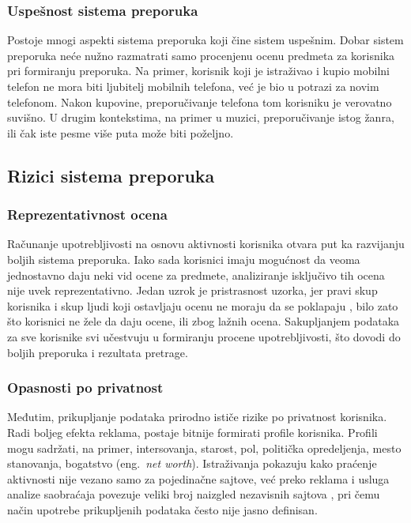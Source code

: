 \documentclass[a4paper]{article}
\begin{document}
\subsubsection{Uspešnost sistema preporuka}
\label{subsubsec:uspesnost_sistema_preporuka}

Postoje mnogi aspekti sistema preporuka koji čine sistem uspešnim. Dobar sistem preporuka neće nužno razmatrati samo procenjenu ocenu predmeta za korisnika pri formiranju preporuka. Na primer, korisnik koji je istraživao i kupio mobilni telefon ne mora biti ljubitelj mobilnih telefona, već je bio u potrazi za novim telefonom. Nakon kupovine, preporučivanje telefona tom korisniku je verovatno suvišno. U drugim kontekstima, na primer u muzici, preporučivanje istog žanra, ili čak iste pesme više puta može biti poželjno.

\subsection{Rizici sistema preporuka}
\label{subsec:rizici_sistema_preporuka}

\subsubsection{Reprezentativnost ocena}
\label{subsubsec:reprezentativnost_ocena}

Računanje upotrebljivosti na osnovu aktivnosti korisnika otvara put ka razvijanju boljih sistema preporuka. Iako sada korisnici imaju mogućnost da veoma jednostavno daju neki vid ocene za predmete, analiziranje isključivo tih ocena nije uvek reprezentativno. Jedan uzrok je pristrasnost uzorka, jer pravi skup korisnika i skup ljudi koji ostavljaju ocenu ne moraju da se poklapaju \cite{panzeri_sampling_2008}, bilo zato što korisnici ne žele da daju ocene, ili zbog lažnih ocena. Sakupljanjem podataka za sve korisnike svi učestvuju u formiranju procene upotrebljivosti, što dovodi do boljih preporuka i rezultata pretrage.

\subsubsection{Opasnosti po privatnost}
\label{subsubsec:opasnosti_po_privatnost}

Međutim, prikupljanje podataka prirodno ističe rizike po privatnost korisnika. Radi boljeg efekta reklama, postaje bitnije formirati profile korisnika. Profili mogu sadržati, na primer, intersovanja, starost, pol, politička opredeljenja, mesto stanovanja, bogatstvo (eng.~{\em net worth}). Istraživanja pokazuju kako praćenje aktivnosti nije vezano samo za pojedinačne sajtove, već preko reklama i usluga analize saobraćaja povezuje veliki broj naizgled nezavisnih sajtova \cite{chaabane_big_2012}, pri čemu način upotrebe prikupljenih podataka često nije jasno definisan.
\end{document}
